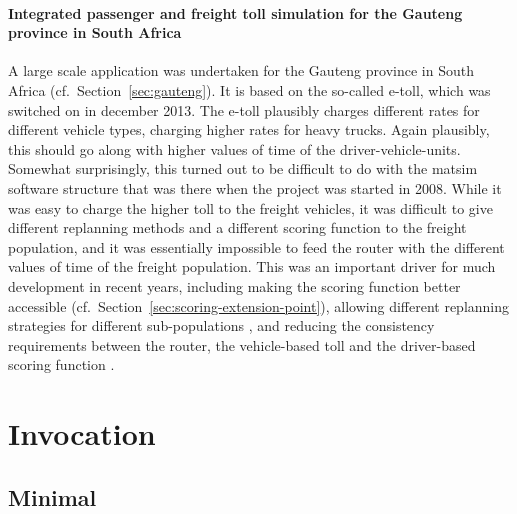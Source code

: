 

\paragraph{Integrated passenger and freight toll simulation for the Gauteng province in South Africa}

A large scale application was undertaken for the Gauteng province in South Africa (cf.\ Section~\ref{sec:gauteng}).  It is based on the so-called e-toll, which was switched on in december 2013.  The e-toll plausibly charges different rates for different vehicle types, charging higher rates for heavy trucks.  Again plausibly, this should go along with higher values of time of the driver-vehicle-units.  Somewhat surprisingly, this turned out to be difficult to do with the \acrshort{matsim} software structure that was there when the project was started in 2008.  While it was easy to charge the higher toll to the freight vehicles, it was difficult to give different replanning methods and a different scoring function to the freight population, and it was essentially impossible to feed the router with the different values of time of the freight population.  This was an important driver for much development in recent years, including making the scoring function better accessible (cf.\ Section~\ref{sec:scoring-extension-point}), allowing different replanning strategies for different sub-populations , and reducing the consistency requirements between the router, the vehicle-based toll and the driver-based scoring function \citep{NagelEtAl_PCS_2014}.



\section{Invocation}

\subsection{Minimal}

